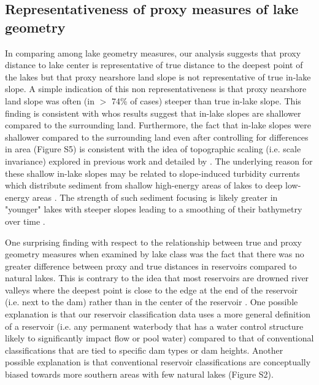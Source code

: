 \documentclass[draft]{agujournal2019}
\begin{document}
\subsection{Representativeness of proxy measures of lake geometry}
\noindent
In comparing among lake geometry measures, our analysis suggests that proxy distance to lake center is representative of true distance to the deepest point of the lakes but that proxy nearshore land slope is not representative of true in-lake slope. A simple indication of this non representativeness is that proxy nearshore land slope was often (in $>$ 74\% of cases) steeper than true in-lake slope. This finding is consistent with  whos results suggest that in-lake slopes are shallower compared to the surrounding land. Furthermore, the fact that in-lake slopes were shallower compared to the surrounding land even after controlling for differences in area (Figure S5) is consistent with the idea of topographic scaling (i.e. scale invariance) explored in previous work and detailed by \cite{caelVolumeMeanDepth2017}. The underlying reason for these shallow in-lake slopes may be related to slope-induced turbidity currents which distribute sediment from shallow high-energy areas of lakes to deep low-energy areas \cite{hakansonLakeBottomDynamics1981, johanssonNewApproachesModelling2007}. The strength of such sediment focusing is likely greater in "younger" lakes with steeper slopes leading to a smoothing of their bathymetry over time \cite{blaisInfluenceLakeMorphometry1995}.

One surprising finding with respect to the relationship between true and proxy geometry measures when examined by lake class was the fact that there was no greater difference between proxy and true distances in reservoirs compared to natural lakes. This is contrary to the idea that most reservoirs are drowned river valleys where the deepest point is close to the edge at the end of the reservoir (i.e. next to the dam) rather than in the center of the reservoir \cite{lanza1985interactions}. One possible explanation is that our reservoir classification data uses a more general definition of a reservoir (i.e. any permanent waterbody that has a water control structure likely to significantly impact flow or pool water) compared to that of conventional classifications that are tied to specific dam types or dam heights. Another possible explanation is that conventional reservoir classifications are conceptually biased towards more southern areas with few natural lakes (Figure S2).
\end{document}
